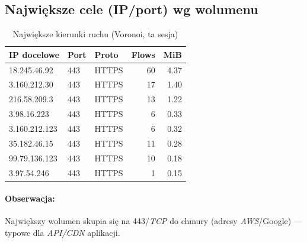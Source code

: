 \subsection{Największe cele (IP/port) wg wolumenu}
\begin{table}[H]
  \centering
  \caption{Największe kierunki ruchu (Voronoi, ta sesja)}
  \label{tab:voronoi-topdst}
  \begin{tabular}{lllrr}
    \toprule
    \textbf{IP docelowe} & \textbf{Port} & \textbf{Proto} & \textbf{Flows} & \textbf{MiB} \\
    \midrule
    18.245.46.92   & 443 & HTTPS & 60 & 4.37 \\
    3.160.212.30   & 443 & HTTPS & 17 & 1.40 \\
    216.58.209.3   & 443 & HTTPS & 13 & 1.22 \\
    3.98.16.223    & 443 & HTTPS & 6  & 0.33 \\
    3.160.212.123  & 443 & HTTPS & 6  & 0.32 \\
    35.182.46.15   & 443 & HTTPS & 11 & 0.28 \\
    99.79.136.123  & 443 & HTTPS & 10 & 0.18 \\
    3.97.54.246    & 443 & HTTPS & 1  & 0.15 \\
    \bottomrule
  \end{tabular}
\end{table}

\paragraph{Obserwacja:}
Największy wolumen skupia się na 443/\emph{TCP} do chmury (adresy \emph{AWS}/Google) — typowe dla \emph{API/CDN} aplikacji.


